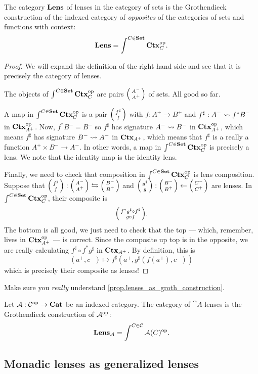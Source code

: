 \documentclass[DynamicalBook]{subfiles}
\begin{document}
\begin{proposition}\label{prop.lenses_as_groth_construction}
  The category $\textbf{Lens}$ of lenses in the category of sets is the
  Grothendieck construction of the indexed category of \emph{opposites} of the
  categories of sets and functions with context:
  $$\textbf{Lens} = \int^{C \in \textbf{Set}} \textbf{Ctx}_{C}^{\textnormal{op}}.$$
\end{proposition}
\begin{proof}
We will expand the
definition of the right hand side and see that it is precisely the category of lenses.

The objects of $\int^{C \in \textbf{Set}} \textbf{Ctx}_{C}^{\textnormal{op}}$ are pairs $\lens{A^-}{A^+}$ of
sets. All good so far.

A map in $\int^{C \in \textbf{Set}} \textbf{Ctx}_{C}^{\textnormal{op}}$ is a pair $\lens{f^{\sharp}}{f}$
with $f : A^+ \to B^+$ and $f^{\sharp} : A^- \rightsquigarrow f^{\ast} B^-$ in
$\textbf{Ctx}_{A^+}^{\textnormal{op}}$. Now, $f^{\ast}B^- = B^-$ so $f^{\sharp}$ has signature $A^-
\rightsquigarrow B^-$ in $\textbf{Ctx}_{A^+}^{\textnormal{op}}$, which means $f^{\sharp}$ has signature $B^-
\rightsquigarrow A^{-}$ in $\textbf{Ctx}_{A^+}$, which means that $f^{\sharp}$ is a really a
function $A^+ \times B^- \to A^{-}$. In other words, a map in $\int^{C \in \textbf{Set}}
\textbf{Ctx}_{C}^{\textnormal{op}}$ is precisely a lens. We note that the identity map is the identity lens.

Finally, we need to check that composition in $\int^{C \in \textbf{Set}} \textbf{Ctx}_{C}^{\textnormal{op}}$
is lens composition. Suppose that $\lens{f^{\sharp}}{f} :
  \lens{A^-}{A^+} \fromto \lens{B^-}{B^+}$ and $\lens{g^{\sharp}}{g} :
  \lens{B^-}{B^+} \from \lens{C^-}{C^+}$ are lenses. In $\int^{C \in \textbf{Set}}
  \textbf{Ctx}_{C}^{\textnormal{op}}$, their composite is
$$\lens{f^{\ast}g^{\sharp} \circ f^{\sharp}}{g \circ f}.$$
  The bottom is all good, we just need to check that the top --- which,
  remember, lives in $\textbf{Ctx}_{A^+}^{\textnormal{op}}$ --- is correct. Since the composite up top
  is in
  the opposite, we are really calculating $f^{\sharp} \circ f^{\ast} g^{\sharp}$
  in $\textbf{Ctx}_{A^+}$. By definition, this is
$$(a^+, c^-) \mapsto f^{\sharp}(a^+, g^{\sharp}(f(a^+), c^-))$$
which is precisely their composite as lenses!
\end{proof}

\begin{exercise}\label{ex.really_understand_charts_as_groth_construction}
  Make sure you \emph{really} understand \cref{prop.lenses_as_groth_construction}.
\end{exercise}

\begin{definition}
 Let $\mathcal{A} : \mathcal{C}^{\textnormal{op}} \to \textbf{Cat}$ be an indexed category. The category of $\cat{A}$-lenses is the Grothendieck construction of
     $\mathcal{A}^{\textnormal{op}}$:
$$\textbf{Lens}_{\mathcal{A}} = \int^{C \in \mathcal{C}} \mathcal{A}(C)^{\textnormal{op}}.$$
\end{definition}

\subsection{Monadic lenses as generalized lenses}
\end{document}

